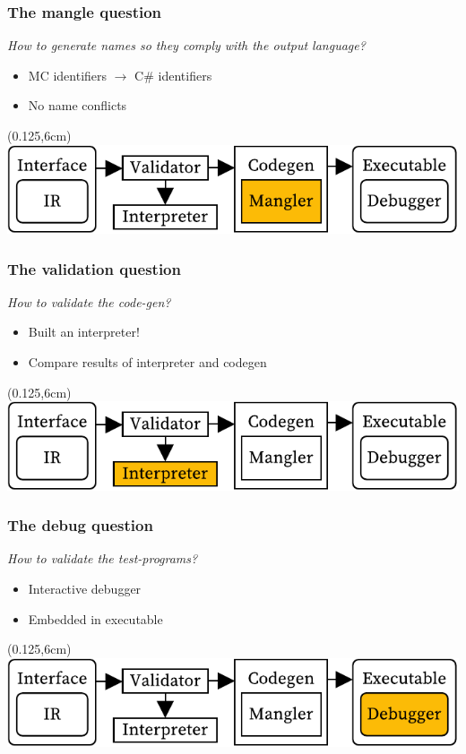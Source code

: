 \documentclass[xetex,serif]{beamer}
\begin{document}
\begin{frame}[t]
\end{frame}\begin{frame}[t]\frametitle{The mangle question}
\textit{How to generate names so they comply with the output language?}
\begin{itemize}
    \item MC identifiers $\longrightarrow$ C\# identifiers
    \item No name conflicts
\end{itemize}
\begin{textblock*}{0.75\paperwidth}(0.125\paperwidth,6cm)\includegraphics[width=0.75\paperwidth]{overview_mangler}\end{textblock*}

\end{frame}\begin{frame}[t]\frametitle{The validation question}
\textit{How to validate the code-gen?}
\begin{itemize}
    \item Built an interpreter!
    \item Compare results of interpreter and codegen
\end{itemize}
\begin{textblock*}{0.75\paperwidth}(0.125\paperwidth,6cm)\includegraphics[width=0.75\paperwidth]{overview_validation}\end{textblock*}

\end{frame}\begin{frame}[t]\frametitle{The debug question}
\textit{How to validate the test-programs?}
\begin{itemize}
    \item Interactive debugger
    \item Embedded in executable
\end{itemize}
\begin{textblock*}{0.75\paperwidth}(0.125\paperwidth,6cm)\includegraphics[width=0.75\paperwidth]{overview_debugger}\end{textblock*}


\end{frame}
\end{document}
